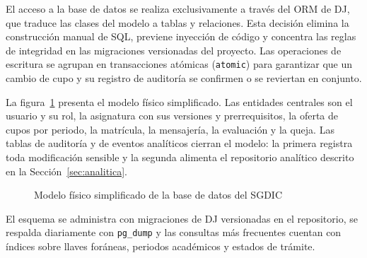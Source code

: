 El acceso a la base de datos se realiza exclusivamente a través del \ac{ORM} de
\ac{DJ}, que traduce las clases del modelo a tablas y relaciones. Esta decisión
elimina la construcción manual de \ac{SQL}, previene inyección de código y
concentra las reglas de integridad en las migraciones versionadas del proyecto.
Las operaciones de escritura se agrupan en transacciones atómicas
(\texttt{atomic}) para garantizar que un cambio de cupo y su registro de auditoría
se confirmen o se reviertan en conjunto.

La figura~\ref{fig:datos} presenta el modelo físico simplificado. Las entidades
centrales son el usuario y su rol, la asignatura con sus versiones y
prerrequisitos, la oferta de cupos por periodo, la matrícula, la mensajería, la
evaluación y la queja. Las tablas de auditoría y de eventos analíticos cierran el
modelo: la primera registra toda modificación sensible y la segunda alimenta el
repositorio analítico descrito en la Sección~\ref{sec:analitica}.

\begin{figure}[H]
\centering
{}%
\caption{Modelo físico simplificado de la base de datos del \ac{SGDIC}}
\label{fig:datos}
\end{figure}

El esquema se administra con migraciones de \ac{DJ} versionadas en el
repositorio, se respalda diariamente con \texttt{pg\_dump} y las consultas más
frecuentes cuentan con índices sobre llaves foráneas, periodos académicos y
estados de trámite.

